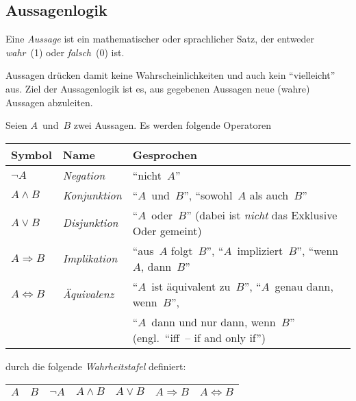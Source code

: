 \documentclass[a4paper]{article}
\begin{document}
\subsection{Aussagenlogik}

\begin{definition}[Aussage]
    Eine \emph{Aussage} ist ein mathematischer oder sprachlicher Satz, der entweder \emph{wahr}~(1) oder \emph{falsch}~(0) ist.
\end{definition}

Aussagen drücken damit keine Wahrscheinlichkeiten und auch kein "`vielleicht"' aus. Ziel der Aussagenlogik ist es, aus gegebenen Aussagen neue (wahre) Aussagen abzuleiten.

\begin{definition}
    Seien $A$~und~$B$ zwei Aussagen. Es werden folgende Operatoren
    \begin{center}
        \begin{tabular}{lll}\toprule
            Symbol                & Name               & Gesprochen                                                             \\\midrule
            $\neg A$              & \emph{Negation}    & "`nicht~$A$"'                                                          \\
            $A \wedge B$          & \emph{Konjunktion} & "`$A$~und~$B$"', "`sowohl~$A$ als auch~$B$"'                           \\
            $A \vee B$            & \emph{Disjunktion} & "`$A$~oder~$B$"' (dabei ist \emph{nicht} das Exklusive Oder gemeint)   \\
            $A \Rightarrow B$     & \emph{Implikation} & "`aus~$A$ folgt~$B$"', "`$A$~impliziert~$B$"', "`wenn~$A$, dann~$B$"'  \\
            $A \Leftrightarrow B$ & \emph{Äquivalenz}  & "`$A$~ist äquivalent zu~$B$"', "`$A$~genau dann, wenn~$B$"',           \\
                                  &                    & "`$A$~dann und nur dann, wenn~$B$"' (engl.\ "`iff~-- if and only if"') \\\bottomrule
        \end{tabular}
    \end{center}
    durch die folgende \emph{Wahrheitstafel} definiert:
    \begin{center}
        \begin{tabular}{cc@{\colsep}ccccc}\toprule
            $A$ & $B$ & $\neg A$ & $A \wedge B$ & $A \vee B$ & $A \Rightarrow B$ & $A \Leftrightarrow B$ \\\midrule

\end{tabular}
\end{center}
\end{definition}
\end{document}
